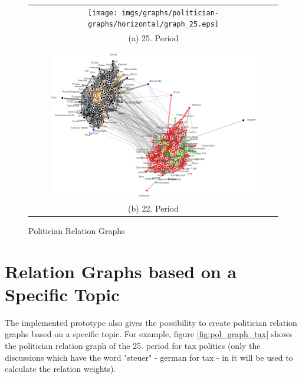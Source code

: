 
\begin{figure}
\center
\begin{tabular}{ c }
	\texttt{[image: imgs/graphs/politician-graphs/horizontal/graph\_25.eps]}
	\\
	(a) 25. Period
	\\
	\\
	\hline
	\\
	
	\includegraphics[width=0.85\textwidth]{imgs/graphs/politician-graphs/horizontal/graph_22.eps}
	\\
	(b) 22. Period
\end{tabular}
	
	
	\caption{Politician Relation Graphs}
	\label{fig:pol_graphs1}
\end{figure}

\section{Relation Graphs based on a Specific Topic}
The implemented prototype also gives the possibility to create politician relation graphs based on a specific topic. For example, figure \ref{fig:pol_graph_tax} shows the politician relation graph of the 25. period for tax politics (only the discussions which have the word "steuer" - german for tax - in it will be used to calculate the relation weights). 

